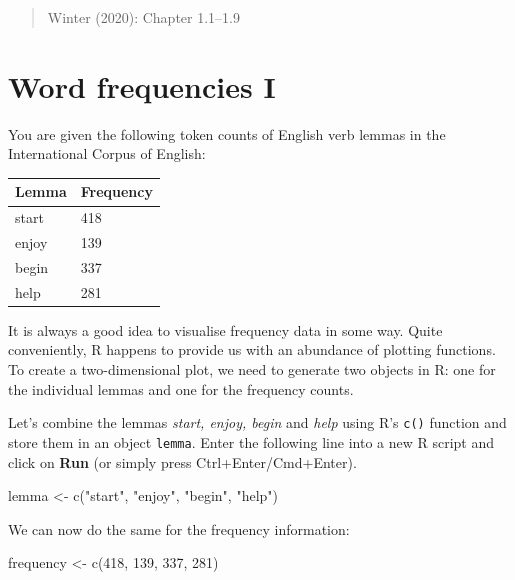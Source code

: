 \documentclass[
  11pt,
  letterpaper,
  DIV=11,
  numbers=noendperiod]{scrreprt}
\newenvironment{Shaded}{\begin{snugshade}}{\end{snugshade}}
\newcommand{\DecValTok}[1]{\textcolor[rgb]{0.68,0.00,0.00}{#1}}
\newcommand{\FunctionTok}[1]{\textcolor[rgb]{0.28,0.35,0.67}{#1}}
\newcommand{\NormalTok}[1]{\textcolor[rgb]{0.00,0.23,0.31}{#1}}
\newcommand{\OtherTok}[1]{\textcolor[rgb]{0.00,0.23,0.31}{#1}}
\newcommand{\StringTok}[1]{\textcolor[rgb]{0.13,0.47,0.30}{#1}}
\begin{document}
\begin{quote}
Winter (2020): Chapter 1.1--1.9
\end{quote}

\section{Word frequencies I}\label{word-frequencies-i}

You are given the following token counts of English verb lemmas in the
International Corpus of English:

\begin{longtable}[]{@{}ll@{}}
\toprule\noalign{}
Lemma & Frequency \\
\midrule\noalign{}
\endhead
\bottomrule\noalign{}
\endlastfoot
start & 418 \\
enjoy & 139 \\
begin & 337 \\
help & 281 \\
\end{longtable}

It is always a good idea to visualise frequency data in some way. Quite
conveniently, R happens to provide us with an abundance of plotting
functions. To create a two-dimensional plot, we need to generate two
objects in R: one for the individual lemmas and one for the frequency
counts.

Let's combine the lemmas \emph{start, enjoy, begin} and \emph{help}
using R's \texttt{c()} function and store them in an object
\texttt{lemma}. Enter the following line into a new R script and click
on \textbf{Run} (or simply press Ctrl+Enter/Cmd+Enter).

\begin{Shaded}
\begin{Highlighting}[]
\NormalTok{lemma }\OtherTok{\textless{}{-}} \FunctionTok{c}\NormalTok{(}\StringTok{"start"}\NormalTok{, }\StringTok{"enjoy"}\NormalTok{, }\StringTok{"begin"}\NormalTok{, }\StringTok{"help"}\NormalTok{)}
\end{Highlighting}
\end{Shaded}

We can now do the same for the frequency information:

\begin{Shaded}
\begin{Highlighting}[]
\NormalTok{frequency }\OtherTok{\textless{}{-}} \FunctionTok{c}\NormalTok{(}\DecValTok{418}\NormalTok{, }\DecValTok{139}\NormalTok{, }\DecValTok{337}\NormalTok{, }\DecValTok{281}\NormalTok{)}
\end{Highlighting}
\end{Shaded}
\end{document}
